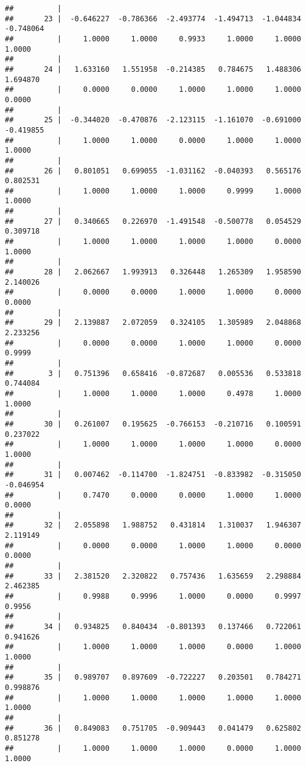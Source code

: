 \documentclass[12pt,]{article}
\begin{document}
\begin{verbatim}
##          |
##       23 |  -0.646227  -0.786366  -2.493774  -1.494713  -1.044834  -0.748064
##          |     1.0000     1.0000     0.9933     1.0000     1.0000     1.0000
##          |
##       24 |   1.633160   1.551958  -0.214385   0.784675   1.488306   1.694870
##          |     0.0000     0.0000     1.0000     1.0000     1.0000     0.0000
##          |
##       25 |  -0.344020  -0.470876  -2.123115  -1.161070  -0.691000  -0.419855
##          |     1.0000     1.0000     0.0000     1.0000     1.0000     1.0000
##          |
##       26 |   0.801051   0.699055  -1.031162  -0.040393   0.565176   0.802531
##          |     1.0000     1.0000     1.0000     0.9999     1.0000     1.0000
##          |
##       27 |   0.340665   0.226970  -1.491548  -0.500778   0.054529   0.309718
##          |     1.0000     1.0000     1.0000     1.0000     0.0000     1.0000
##          |
##       28 |   2.062667   1.993913   0.326448   1.265309   1.958590   2.140026
##          |     0.0000     0.0000     1.0000     1.0000     0.0000     0.0000
##          |
##       29 |   2.139887   2.072059   0.324105   1.305989   2.048868   2.233256
##          |     0.0000     0.0000     1.0000     1.0000     0.0000     0.9999
##          |
##        3 |   0.751396   0.658416  -0.872687   0.005536   0.533818   0.744084
##          |     1.0000     1.0000     1.0000     0.4978     1.0000     1.0000
##          |
##       30 |   0.261007   0.195625  -0.766153  -0.210716   0.100591   0.237022
##          |     1.0000     1.0000     1.0000     1.0000     0.0000     1.0000
##          |
##       31 |   0.007462  -0.114700  -1.824751  -0.833982  -0.315050  -0.046954
##          |     0.7470     0.0000     0.0000     1.0000     1.0000     0.0000
##          |
##       32 |   2.055898   1.988752   0.431814   1.310037   1.946307   2.119149
##          |     0.0000     0.0000     1.0000     1.0000     0.0000     0.0000
##          |
##       33 |   2.381520   2.320822   0.757436   1.635659   2.298884   2.462385
##          |     0.9988     0.9996     1.0000     0.0000     0.9997     0.9956
##          |
##       34 |   0.934825   0.840434  -0.801393   0.137466   0.722061   0.941626
##          |     1.0000     1.0000     1.0000     0.0000     1.0000     1.0000
##          |
##       35 |   0.989707   0.897609  -0.722227   0.203501   0.784271   0.998876
##          |     1.0000     1.0000     1.0000     1.0000     1.0000     1.0000
##          |
##       36 |   0.849083   0.751705  -0.909443   0.041479   0.625802   0.851278
##          |     1.0000     1.0000     1.0000     0.0000     1.0000     1.0000

\end{verbatim}
\end{document}
